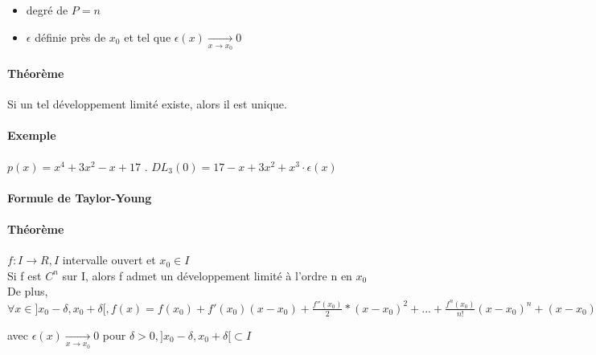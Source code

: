 \begin{itemize}
	\item degré de $P = n$
	\item $\epsilon$ définie près de $x_0$ et tel que $\epsilon(x) \xrightarrow[x \to x_0]{} 0$
\end{itemize}

\paragraph{Théorème} Si un tel développement limité existe, alors il est unique.
\paragraph{Exemple} $p(x) = x^4 + 3x^2 -x + 17$ . $DL_3(0) = 17 -x +3x^2 + x^3\cdot \epsilon(x)$

\paragraph{Formule de Taylor-Young}
\paragraph{Théorème} $f : I \rightarrow R, I$ intervalle ouvert et $x_0 \in I$ ~\\
Si f est $C^n$ sur I, alors f admet un développement limité à l'ordre n en $x_0$ ~\\
De plus, $\forall x \in ]x_0-\delta, x_0+\delta[, f(x)=f(x_0)+f'(x_0)(x-x_0)+\frac{f''(x_0)}{2}*(x-x_0)^2 + ... + \frac{f^n(x_0)}{n!}(x-x_0)^n + (x-x_0)^n \epsilon(x)$

avec $\epsilon (x) \xrightarrow[x \to x_0]{} 0$ pour $\delta > 0, ]x_0-\delta, x_0+\delta[ \subset I$

